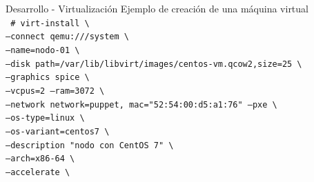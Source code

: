 \begin{frame}{Desarrollo - Virtualización}
    \vspace{-1cm} {Ejemplo de creación de una máquina virtual}
    \\
    \vspace{0.5cm}
    \begingroup
    \fontsize{8pt}{12pt}\selectfont
        \texttt{
        \# virt-install \textbackslash \\
           \hspace{0.75cm} --connect qemu:///system \textbackslash \\
           \hspace{0.75cm} --name=nodo-01 \textbackslash \\
           \hspace{0.75cm} --disk path=/var/lib/libvirt/images/centos-vm.qcow2,size=25 \textbackslash \\
           \hspace{0.75cm} --graphics spice \textbackslash \\
           \hspace{0.75cm} --vcpus=2 --ram=3072 \textbackslash \\
           \hspace{0.75cm} --network network=puppet, mac="52:54:00:d5:a1:76" --pxe \textbackslash \\
           \hspace{0.75cm} --os-type=linux \textbackslash \\
           \hspace{0.75cm} --os-variant=centos7 \textbackslash \\
           \hspace{0.75cm} --description "nodo con CentOS 7" \textbackslash  \\
           \hspace{0.75cm} --arch=x86-64 \textbackslash \\
           \hspace{0.75cm} --accelerate \textbackslash \\
        }    
    \endgroup    
\end{frame}

